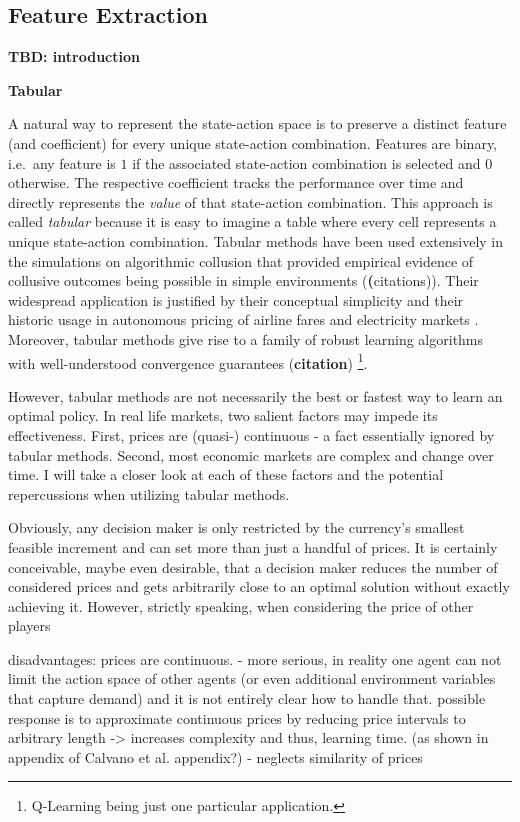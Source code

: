 
\subsection{Feature Extraction}\label{feature_extraction}

\textbf{TBD: introduction}

\textbf{Tabular}

A natural way to represent the state-action space is to preserve a distinct feature (and coefficient) for every unique state-action combination. Features are binary, i.e.\ any feature is $1$ if the associated state-action combination is selected and $0$ otherwise. The respective coefficient tracks the performance over time and directly represents the \emph{value} of that state-action combination. This approach is called \emph{tabular} because it is easy to imagine a table where every cell represents a unique state-action combination. Tabular methods have been used extensively in the simulations on algorithmic collusion that provided empirical evidence of collusive outcomes being possible in simple environments (\textbf(citations)). Their widespread application is justified by their conceptual simplicity and their historic usage in autonomous pricing of airline fares and electricity markets \parencite{ittoo_algorithmic_2017}. Moreover, tabular methods give rise to a family of robust learning algorithms with well-understood convergence guarantees (\textbf{citation}) \footnote{Q-Learning being just one particular application.}.

However, tabular methods are not necessarily the best or fastest way to learn an optimal policy. In real life markets, two salient factors may impede its effectiveness. First, prices are (quasi-) continuous - a fact essentially ignored by tabular methods. Second, most economic markets are complex and change over time. I will take a closer look at each of these factors and the potential repercussions when utilizing tabular methods.

Obviously, any decision maker is only restricted by the currency's smallest feasible increment and can set more than just a handful of prices. It is certainly conceivable, maybe even desirable, that a decision maker reduces the number of considered prices and gets arbitrarily close to an optimal solution without exactly achieving it. However, strictly speaking, when considering the price of other players
	

disadvantages:
prices are continuous.
	- more serious, in reality one agent can not limit the action space of other agents (or even additional environment variables that capture demand) and it is not entirely clear how to handle that. possible response is to approximate continuous prices by reducing price intervals to arbitrary length
		-> increases complexity and thus, learning time. (as shown in appendix of Calvano et al. appendix?)
	- neglects similarity of prices


